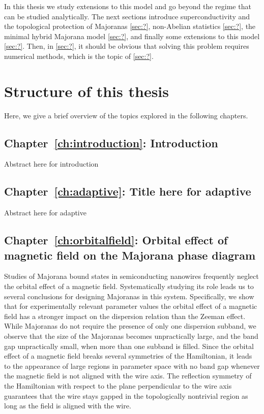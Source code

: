 In this thesis we study extensions to this model and go beyond the regime that can be studied analytically.
The next sections introduce superconductivity and the topological protection of Majoranas \ref{sec:?}, non-Abelian statistics \ref{sec:?}, the minimal hybrid Majorana model \ref{sec:?}, and finally some extensions to this model \ref{sec:?}.
Then, in \ref{sec:?}, it should be obvious that solving this problem requires numerical methods, which is the topic of \ref{sec:?}.

\section{Structure of this thesis}

Here, we give a brief overview of the topics explored in the following chapters.
\vspace{1mm}

\subsection{Chapter~\ref{ch:introduction}: Introduction}
Abstract here for introduction
\vspace{1mm}

\subsection{Chapter~\ref{ch:adaptive}: Title here for adaptive}
Abstract here for adaptive
\vspace{1mm}

\subsection{Chapter~\ref{ch:orbitalfield}: Orbital effect of magnetic field on the Majorana phase diagram}
Studies of Majorana bound states in semiconducting nanowires frequently neglect the orbital effect of a magnetic field.
Systematically studying its role leads us to several conclusions for designing Majoranas in this system.
Specifically, we show that for experimentally relevant parameter values the orbital effect of a magnetic field has a stronger impact on the dispersion relation than the Zeeman effect.
While Majoranas do not require the presence of only one dispersion subband, we observe that the size of the Majoranas becomes unpractically large, and the band gap unpractically small, when more than one subband is filled.
Since the orbital effect of a magnetic field breaks several symmetries of the Hamiltonian, it leads to the appearance of large regions in parameter space with no band gap whenever the magnetic field is not aligned with the wire axis.
The reflection symmetry of the Hamiltonian with respect to the plane perpendicular to the wire axis guarantees that the wire stays gapped in the topologically nontrivial region as long as the field is aligned with the wire.
\vspace{1mm}

